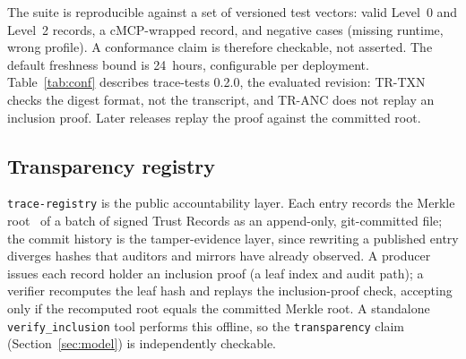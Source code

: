The suite is reproducible against a set of versioned test vectors: valid Level~0
and Level~2 records, a cMCP-wrapped record, and negative cases (missing runtime,
wrong profile). A conformance claim is therefore checkable, not asserted. The default
freshness bound is 24~hours, configurable per deployment.
Table~\ref{tab:conf} describes trace-tests 0.2.0, the evaluated revision:
TR-TXN checks the digest format, not the transcript, and TR-ANC does not replay
an inclusion proof. Later releases replay the proof against the committed root.

\subsection{Transparency registry}

\texttt{trace-registry} is the public accountability layer. Each entry records the
Merkle root~\citep{ct2013} of a batch of signed Trust Records as an append-only,
git-committed file; the commit history is the tamper-evidence layer, since rewriting a
published entry diverges hashes that auditors and mirrors have already observed. A
producer issues each record holder an inclusion proof (a leaf index and audit path);
a verifier recomputes the leaf hash and replays the inclusion-proof check, accepting
only if the recomputed root equals the committed Merkle root. A standalone
\texttt{verify\_inclusion} tool performs this offline, so the \texttt{transparency}
claim (Section~\ref{sec:model}) is independently checkable.
